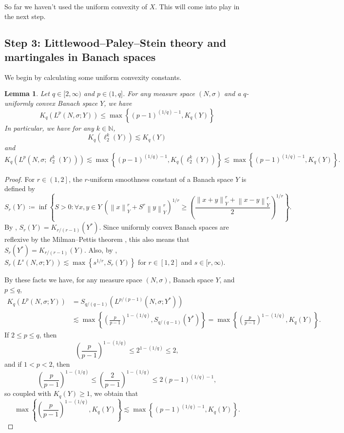 \documentclass[11pt,reqno]{amsart}
\newtheorem{lemma}[theorem]{Lemma}
\newcommand{\1}{\mathbf 1}
\begin{document}
So far we haven't used the uniform convexity of $X$. This will come into play in the next step.


\subsection{Step 3: Littlewood--Paley--Stein theory and martingales in Banach spaces}\label{subsec:step3}
We begin by calculating some uniform convexity constants.
\begin{lemma}\label{lem:lp-unif-cvx}
	Let $q\in [2,\infty)$ and $p\in (1,q]$. For any measure space $\left(N,\sigma\right)$ and a $q$-uniformly convex Banach space $Y$, we have 
	\[
		K_q\left(L^p\left(N,\sigma;Y\right)\right)\le  \max\left\{\left(p-1\right)^{(1/q)-1},K_q\left(Y\right)\right\}
	\]
		In particular, we have for any $k\in \mathbb{N}$,
	\[
	K_q\left(\ell_2^k\left(Y\right)\right)\lesssim K_q\left(Y\right)
	\]
	and
	\begin{equation}\label{eq:lpl2-unifcvx}
	K_q\left(L^p\left(N,\sigma;\ell_2^k\left(Y\right)\right)\right)\lesssim \max\left\{\left(p-1\right)^{(1/q)-1},K_q\left(\ell_2^k\left(Y\right)\right)\right\}\lesssim \max\left\{\left(p-1\right)^{(1/q)-1},K_q\left(Y\right)\right\}.
	\end{equation}
\end{lemma}
\begin{proof}
	For $r\in \left(1,2\right]$, the $r$-uniform smoothness constant of a Banach space $Y$ is defined by
	\[
	S_r\left(Y\right)\coloneqq \inf\left\{S>0:\forall x,y\in Y~\left(\left\|x\right\|_Y^r+S^r\left\|y\right\|_Y^r\right)^{1/r}\ge \left(\frac{\left\|x+y\right\|_Y^r+\left\|x-y\right\|_Y^r}{2}\right)^{1/r}\right\}.
	\]
	By \cite[Lemma 5]{ball1994sharp}, $S_r(Y)=K_{r/(r-1)}(Y^*)$. Since uniformly convex Banach spaces are reflexive by the Milman--Pettis theorem \cite{milman1938some,pettis1939proof}, this also means that $S_r(Y^*)=K_{r/(r-1)}(Y)$. Also, by \cite[equation (4.4)]{naor2014comparison}, $S_r(L^s(N,\sigma;Y))\lesssim \max\left\{s^{1/r},S_r(Y)\right\}$ for $r\in [1,2]$ and $s\in [r,\infty)$.
	
	By these facts we have, for any measure space $\left(N,\sigma\right)$, Banach space $Y$, and $p\le q$,
	\begin{align*}
		K_q\left(L^p\left(N,\sigma;Y\right)\right)&=S_{q/\left(q-1\right)}\left(L^{p/\left(p-1\right)}\left(N,\sigma;Y^*\right)\right)\\
		&\lesssim \max\left\{\left(\frac{p}{p-1}\right)^{1-(1/q)},S_{q/\left(q-1\right)}\left(Y^*\right)\right\}= \max\left\{\left(\frac{p}{p-1}\right)^{1-(1/q)},K_q\left(Y\right)\right\}.
	\end{align*}
If $2\le p\le q$, then
\[
\left(\frac{p}{p-1}\right)^{1-(1/q)}\le 2^{1-(1/q)}\le 2,
\]
and if $1<p<2$, then
\[
\left(\frac{p}{p-1}\right)^{1-(1/q)}\le \left(\frac{2}{p-1}\right)^{1-(1/q)}\le 2\left(p-1\right)^{(1/q)-1},
\]
so coupled with $K_q(Y)\ge 1$, we obtain that
\[
\max\left\{\left(\frac{p}{p-1}\right)^{1-(1/q)},K_q\left(Y\right)\right\}\lesssim \max\left\{\left(p-1\right)^{(1/q)-1},K_q\left(Y\right)\right\}.
\]

\end{proof}
\end{document}
